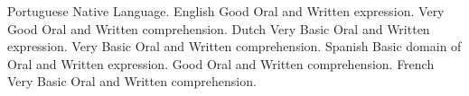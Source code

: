 \begin{cvhonors}
  \cvhonor
    {Portuguese}
    {Native Language.}
    {}
    {}
  \cvhonor
    {English}
    {Good Oral and Written expression. Very Good Oral and Written comprehension.}
    {}
    {}
  \cvhonor
    {Dutch}
    {Very Basic Oral and Written expression. Very Basic Oral and Written comprehension.}
    {}
    {}    
  \cvhonor
    {Spanish }
    {Basic domain of Oral and Written expression. Good Oral and Written comprehension.}
    {}
    {}
  \cvhonor
    {French}
    {Very Basic Oral and Written comprehension.}
    {}
    {}
\end{cvhonors}
